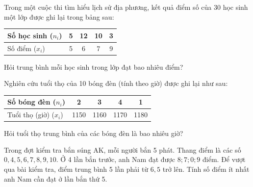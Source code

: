 \begin{vd}
	Trong một cuộc thi tìm hiểu lịch sử địa phương, kết quả điểm số của 30 học sinh một lớp được ghi lại trong bảng sau:
	\begin{center}
	\begin{tabular}{|l|c|c|c|c|}
		\hline
		Số học sinh ($n_i$) & 5 & 12 & 10 & 3 \\
		\hline
		Số điểm ($x_i$) & 5 & 6 & 7 & 9 \\
		\hline
	\end{tabular}
	\end{center}
	Hỏi trung bình mỗi học sinh trong lớp đạt bao nhiêu điểm?
\end{vd}

\begin{vd}
	Nghiên cứu tuổi thọ của 10 bóng đèn (tính theo giờ) được ghi lại như sau:
	\begin{center}
	\begin{tabular}{|l|c|c|c|c|}
		\hline
		Số bóng đèn ($n_i$) & 2 & 3 & 4 & 1 \\
		\hline
		Tuổi thọ (giờ) ($x_i$) & 1150 & 1160 & 1170 & 1180 \\
		\hline
	\end{tabular}
	\end{center}
	Hỏi tuổi thọ trung bình của các bóng đèn là bao nhiêu giờ?
\end{vd}

\begin{vd}
	Trong đợt kiểm tra bắn súng AK, mỗi người bắn 5 phát. Thang điểm là các số $0, 4, 5, 6, 7, 8, 9, 10$. Ở 4 lần bắn trước, anh Nam đạt được $8; 7; 0; 9$ điểm. Để vượt qua bài kiểm tra, điểm trung bình 5 lần phải từ $6{,}5$ trở lên. Tính số điểm ít nhất anh Nam cần đạt ở lần bắn thứ 5.
\end{vd}

